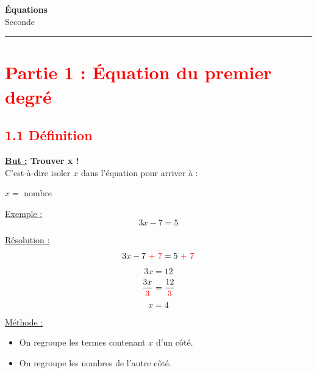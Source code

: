 \documentclass[12pt]{article}
\begin{document}

\begin{center}
    {\LARGE \textbf{Équations}}\\[4mm]
    {\large Seconde}
\end{center}

\hrule
\vspace{0.4cm}


\section*{\textcolor{red}{Partie 1 : Équation du premier degré}}

\subsection*{\textcolor{red}{1.1 Définition}}

\vspace{5pt}

\begin{mdframed}[
    linewidth=1pt,
    linecolor=Red,
    innertopmargin=10pt,
]
{\color{red}
\textbf{\underline{But :} Trouver x !}
\vspace{5pt}\\
C'est-à-dire isoler $x$ dans l'équation pour arriver à :
\begin{center}
    $x=$ nombre
\end{center}
\vspace{0pt}
}
\end{mdframed}

\vspace{10pt}

\underline{Exemple :}
\[
3x - 7 = 5
\]

\vspace{5pt}

\underline{Résolution :}
\[
3x - 7 \textcolor{red}{\ +\ 7} = 5 \textcolor{red}{\ +\ 7}
\]
\[
3x = 12
\]
\[
\dfrac{3x}{\textcolor{red}{3}} = \dfrac{12}{\textcolor{red}{3}}
\]
\[
x = 4
\]

\vspace{10pt}

\begin{mdframed}[
    linewidth=1pt,
    roundcorner=5pt,
    linecolor=Red
]
{\color{red}
\underline{Méthode :}
\begin{itemize}
    \item On regroupe les termes contenant $x$ d'un côté.
    \item On regroupe les nombres de l'autre côté.
\end{itemize}
}
\end{mdframed}
\end{document}
